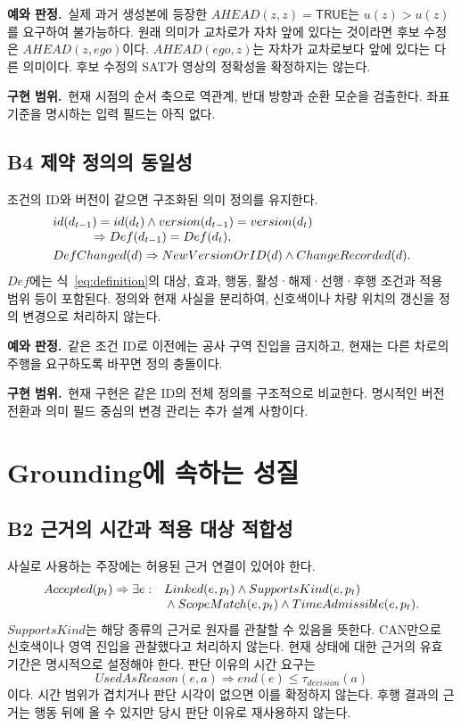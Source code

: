 \documentclass[11pt,a4paper]{article}
\newcommand{\pred}[1]{\mathsf{#1}}
\newcommand{\example}{\par\textbf{예와 판정.}\ }
\newcommand{\impl}{\par\textbf{구현 범위.}\ }
\begin{document}
\example 실제 과거 생성본에 등장한 $AHEAD(z,z)=\pred{TRUE}$는
$u(z)>u(z)$를 요구하여 불가능하다.
원래 의미가 교차로가 자차 앞에 있다는 것이라면 후보 수정은 $AHEAD(z,ego)$이다.
$AHEAD(ego,z)$는 자차가 교차로보다 앞에 있다는 다른 의미이다.
후보 수정의 SAT가 영상의 정확성을 확정하지는 않는다.
\impl 현재 시점의 순서 축으로 역관계, 반대 방향과 순환 모순을 검출한다.
좌표 기준을 명시하는 입력 필드는 아직 없다.

\subsection{B4 제약 정의의 동일성}\label{prop:b4}
조건의 ID와 버전이 같으면 구조화된 의미 정의를 유지한다.
\begin{align}
 &id(d_{t-1})=id(d_t)\land version(d_{t-1})=version(d_t)\notag\\[-0.3em]
 &\hspace{3em}\Rightarrow Def(d_{t-1})=Def(d_t),\label{eq:b4}\\
 &DefChanged(d)\Rightarrow NewVersionOrID(d)\land ChangeRecorded(d).
\end{align}
$Def$에는 식~\eqref{eq:definition}의 대상, 효과, 행동,
활성·해제·선행·후행 조건과 적용 범위 등이 포함된다.
정의와 현재 사실을 분리하여, 신호색이나 차량 위치의 갱신을 정의 변경으로 처리하지 않는다.

\example 같은 조건 ID로 이전에는 공사 구역 진입을 금지하고,
현재는 다른 차로의 주행을 요구하도록 바꾸면 정의 충돌이다.
\impl 현재 구현은 같은 ID의 전체 정의를 구조적으로 비교한다.
명시적인 버전 전환과 의미 필드 중심의 변경 관리는 추가 설계 사항이다.

\section{Grounding에 속하는 성질}
\subsection{B2 근거의 시간과 적용 대상 적합성}\label{prop:b2}
사실로 사용하는 주장에는 허용된 근거 연결이 있어야 한다.
\begin{align}
 Accepted(p_t)\Rightarrow\exists e:\quad
 &Linked(e,p_t)\land SupportsKind(e,p_t)\notag\\[-0.3em]
 &\land ScopeMatch(e,p_t)\land TimeAdmissible(e,p_t).\label{eq:b2fact}
\end{align}
$SupportsKind$는 해당 종류의 근거로 원자를 관찰할 수 있음을 뜻한다.
CAN만으로 신호색이나 영역 진입을 관찰했다고 처리하지 않는다.
현재 상태에 대한 근거의 유효 기간은 명시적으로 설정해야 한다.
판단 이유의 시간 요구는
\begin{equation}
 UsedAsReason(e,a)\Rightarrow end(e)\le\tau_{decision}(a)\label{eq:b2time}
\end{equation}
이다. 시간 범위가 겹치거나 판단 시각이 없으면 이를 확정하지 않는다.
후행 결과의 근거는 행동 뒤에 올 수 있지만 당시 판단 이유로 재사용하지 않는다.
\end{document}
